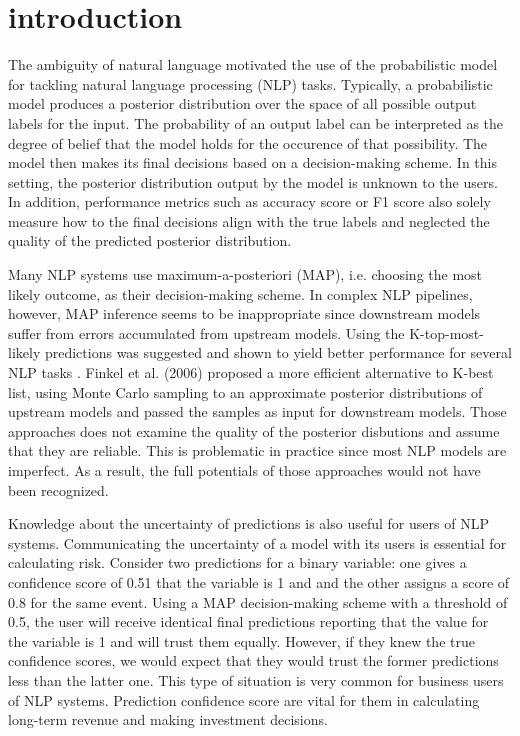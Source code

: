 \chapter{introduction}
\doublespacenormalsize
The ambiguity of natural language motivated the use of the probabilistic model for tackling natural language processing (NLP) tasks. Typically, a probabilistic model produces a posterior distribution over the space of all possible output labels for the input. The probability of an output label can be interpreted as the degree of belief that the model holds for the occurence of that possibility. The model then makes its final decisions based on a decision-making scheme. In this setting, the posterior distribution output by the model is unknown to the users. In addition, performance metrics such as accuracy score or F1 score also solely measure how to the final decisions align with the true labels and neglected the quality of the predicted posterior distribution. 

Many NLP systems use maximum-a-posteriori (MAP), i.e. choosing the most likely outcome, as their decision-making scheme. In complex NLP pipelines, however, MAP inference seems to be inappropriate since downstream models suffer from errors accumulated from upstream models. Using the K-top-most-likely predictions was suggested and shown to yield better performance for several NLP tasks \citep{sutton2005joint, wellner2004integrated}. Finkel et al. (2006) proposed a more efficient alternative to K-best list, using Monte Carlo sampling to an approximate posterior distributions of upstream models and passed the samples as input for downstream models. Those approaches does not examine the quality of the posterior disbutions and assume that they are reliable. This is problematic in practice since most NLP models are imperfect. As a result, the full potentials of those approaches would not have been recognized. 

Knowledge about the uncertainty of predictions is also useful for users of NLP systems. Communicating the uncertainty of a model with its users is essential for calculating risk. Consider two predictions for a binary variable: one gives a confidence score of 0.51 that the variable is 1 and and the other assigns a score of 0.8 for the same event. Using a MAP decision-making scheme with a threshold of 0.5, the user will receive identical final predictions reporting that the value for the variable is 1 and will trust them equally. However, if they knew the true confidence scores, we would expect that they would trust the former predictions less than the latter one. This type of situation is very common for business users of NLP systems. Prediction confidence score are vital for them in calculating long-term revenue and making investment decisions.

